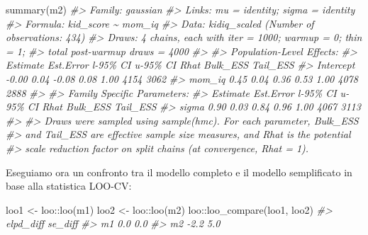 \documentclass[
  10pt,
  italian,
  a4paper,
  extrafontsizes,onecolumn,openright
  ]{memoir}
\newenvironment{Shaded}{\begin{snugshade}}{\end{snugshade}}
\newcommand{\CommentTok}[1]{\textcolor[rgb]{0.56,0.35,0.01}{\textit{#1}}}
\newcommand{\FunctionTok}[1]{\textcolor[rgb]{0.00,0.00,0.00}{#1}}
\newcommand{\NormalTok}[1]{#1}
\newcommand{\OtherTok}[1]{\textcolor[rgb]{0.56,0.35,0.01}{#1}}
\newcommand{\SpecialCharTok}[1]{\textcolor[rgb]{0.00,0.00,0.00}{#1}}
\theoremstyle{definition}
\theoremstyle{definition}
\theoremstyle{definition}
\theoremstyle{definition}
\theoremstyle{remark}
\begin{document}
\begin{Shaded}
\begin{Highlighting}[]
\FunctionTok{summary}\NormalTok{(m2)}
\CommentTok{\#\textgreater{}  Family: gaussian }
\CommentTok{\#\textgreater{}   Links: mu = identity; sigma = identity }
\CommentTok{\#\textgreater{} Formula: kid\_score \textasciitilde{} mom\_iq }
\CommentTok{\#\textgreater{}    Data: kidiq\_scaled (Number of observations: 434) }
\CommentTok{\#\textgreater{}   Draws: 4 chains, each with iter = 1000; warmup = 0; thin = 1;}
\CommentTok{\#\textgreater{}          total post{-}warmup draws = 4000}
\CommentTok{\#\textgreater{} }
\CommentTok{\#\textgreater{} Population{-}Level Effects: }
\CommentTok{\#\textgreater{}           Estimate Est.Error l{-}95\% CI u{-}95\% CI Rhat Bulk\_ESS Tail\_ESS}
\CommentTok{\#\textgreater{} Intercept    {-}0.00      0.04    {-}0.08     0.08 1.00     4154     3062}
\CommentTok{\#\textgreater{} mom\_iq        0.45      0.04     0.36     0.53 1.00     4078     2888}
\CommentTok{\#\textgreater{} }
\CommentTok{\#\textgreater{} Family Specific Parameters: }
\CommentTok{\#\textgreater{}       Estimate Est.Error l{-}95\% CI u{-}95\% CI Rhat Bulk\_ESS Tail\_ESS}
\CommentTok{\#\textgreater{} sigma     0.90      0.03     0.84     0.96 1.00     4067     3113}
\CommentTok{\#\textgreater{} }
\CommentTok{\#\textgreater{} Draws were sampled using sample(hmc). For each parameter, Bulk\_ESS}
\CommentTok{\#\textgreater{} and Tail\_ESS are effective sample size measures, and Rhat is the potential}
\CommentTok{\#\textgreater{} scale reduction factor on split chains (at convergence, Rhat = 1).}
\end{Highlighting}
\end{Shaded}

Eseguiamo ora un confronto tra il modello completo e il modello semplificato in base alla statistica LOO-CV:

\begin{Shaded}
\begin{Highlighting}[]
\NormalTok{loo1 }\OtherTok{\textless{}{-}}\NormalTok{ loo}\SpecialCharTok{::}\FunctionTok{loo}\NormalTok{(m1)}
\NormalTok{loo2 }\OtherTok{\textless{}{-}}\NormalTok{ loo}\SpecialCharTok{::}\FunctionTok{loo}\NormalTok{(m2)}
\NormalTok{loo}\SpecialCharTok{::}\FunctionTok{loo\_compare}\NormalTok{(loo1, loo2)}
\CommentTok{\#\textgreater{}    elpd\_diff se\_diff}
\CommentTok{\#\textgreater{} m1  0.0       0.0   }
\CommentTok{\#\textgreater{} m2 {-}2.2       5.0}
\end{Highlighting}
\end{Shaded}
\end{document}
